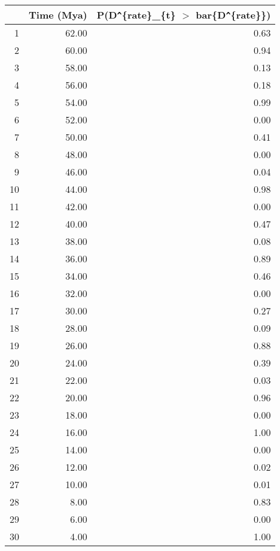 \begin{table}[ht]
\centering
\begin{tabular}{rrr}
  \hline
 & Time (Mya) & P(D\verb|^|\{rate\}\_\{t\} $>$ bar\{D\verb|^|\{rate\}\}) \\ 
  \hline
1 & 62.00 & 0.63 \\ 
  2 & 60.00 & 0.94 \\ 
  3 & 58.00 & 0.13 \\ 
  4 & 56.00 & 0.18 \\ 
  5 & 54.00 & 0.99 \\ 
  6 & 52.00 & 0.00 \\ 
  7 & 50.00 & 0.41 \\ 
  8 & 48.00 & 0.00 \\ 
  9 & 46.00 & 0.04 \\ 
  10 & 44.00 & 0.98 \\ 
  11 & 42.00 & 0.00 \\ 
  12 & 40.00 & 0.47 \\ 
  13 & 38.00 & 0.08 \\ 
  14 & 36.00 & 0.89 \\ 
  15 & 34.00 & 0.46 \\ 
  16 & 32.00 & 0.00 \\ 
  17 & 30.00 & 0.27 \\ 
  18 & 28.00 & 0.09 \\ 
  19 & 26.00 & 0.88 \\ 
  20 & 24.00 & 0.39 \\ 
  21 & 22.00 & 0.03 \\ 
  22 & 20.00 & 0.96 \\ 
  23 & 18.00 & 0.00 \\ 
  24 & 16.00 & 1.00 \\ 
  25 & 14.00 & 0.00 \\ 
  26 & 12.00 & 0.02 \\ 
  27 & 10.00 & 0.01 \\ 
  28 & 8.00 & 0.83 \\ 
  29 & 6.00 & 0.00 \\ 
  30 & 4.00 & 1.00 \\ 
   \hline
\end{tabular}
\label{tab:rate_peak}
\end{table}
